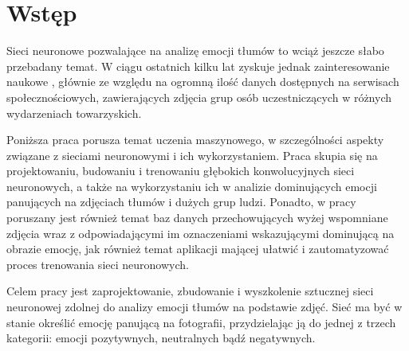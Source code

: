 \chapter{Wstęp}
\thispagestyle{chapterBeginStyle}
\label{chapter1}


Sieci neuronowe pozwalające na analizę emocji tłumów to wciąż jeszcze słabo przebadany temat. W ciągu ostatnich kilku lat zyskuje jednak zainteresowanie naukowe \cite{Group1}\cite{Group2}\cite{Group3}\cite{Group4}, głównie ze względu na ogromną ilość danych dostępnych na serwisach społecznościowych, zawierających zdjęcia grup osób uczestniczących w różnych wydarzeniach towarzyskich.

Poniższa praca porusza temat uczenia maszynowego, w szczególności aspekty związane z sieciami neuronowymi i ich wykorzystaniem. Praca skupia się na projektowaniu, budowaniu i trenowaniu głębokich konwolucyjnych sieci neuronowych, a także na wykorzystaniu ich w analizie dominujących emocji panujących na zdjęciach tłumów i dużych grup ludzi. Ponadto, w pracy poruszany jest również temat baz danych przechowujących wyżej wspomniane zdjęcia wraz z odpowiadającymi im oznaczeniami wskazującymi dominującą na obrazie emocję, jak również temat aplikacji mającej ułatwić i zautomatyzować proces trenowania sieci neuronowych.

Celem pracy jest zaprojektowanie, zbudowanie i wyszkolenie sztucznej sieci neuronowej zdolnej do analizy emocji tłumów na podstawie zdjęć. Sieć ma być w stanie określić emocję panującą na fotografii, przydzielając ją do jednej z trzech kategorii: emocji pozytywnych, neutralnych bądź negatywnych.

